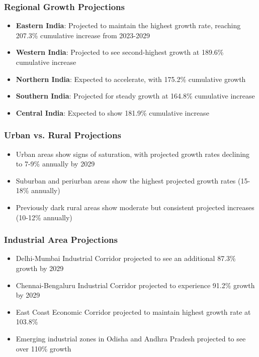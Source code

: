 \documentclass[12pt,a4paper]{article}
\begin{document}
\subsubsection{Regional Growth Projections}
\begin{itemize}
    \item \textbf{Eastern India}: Projected to maintain the highest growth rate, reaching 207.3\% cumulative increase from 2023-2029
    \item \textbf{Western India}: Projected to see second-highest growth at 189.6\% cumulative increase
    \item \textbf{Northern India}: Expected to accelerate, with 175.2\% cumulative growth
    \item \textbf{Southern India}: Projected for steady growth at 164.8\% cumulative increase
    \item \textbf{Central India}: Expected to show 181.9\% cumulative increase
\end{itemize}

\subsubsection{Urban vs. Rural Projections}
\begin{itemize}
    \item Urban areas show signs of saturation, with projected growth rates declining to 7-9\% annually by 2029
    \item Suburban and periurban areas show the highest projected growth rates (15-18\% annually)
    \item Previously dark rural areas show moderate but consistent projected increases (10-12\% annually)
\end{itemize}

\subsubsection{Industrial Area Projections}
\begin{itemize}
    \item Delhi-Mumbai Industrial Corridor projected to see an additional 87.3\% growth by 2029
    \item Chennai-Bengaluru Industrial Corridor projected to experience 91.2\% growth by 2029
    \item East Coast Economic Corridor projected to maintain highest growth rate at 103.8\%
    \item Emerging industrial zones in Odisha and Andhra Pradesh projected to see over 110\% growth
\end{itemize}
\end{document}

